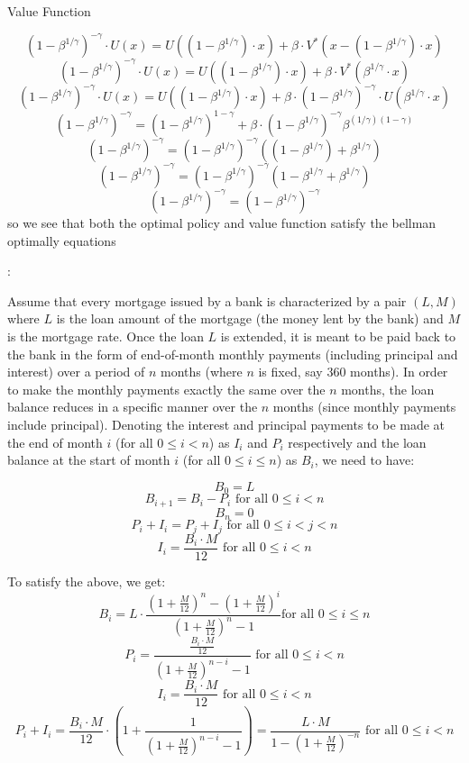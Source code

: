 \documentclass[12pt]{exam}
\begin{document}
\begin{questions}
\begin{itemize}
\begin{solution}
    Value Function
    
    \[(1-\beta^{1/\gamma})^{-\gamma} \cdot U(x) = U((1 - \beta^{1/\gamma}) \cdot x) + \beta \cdot V^*(x - (1 - \beta^{1/\gamma}) \cdot x)\]
    \[(1-\beta^{1/\gamma})^{-\gamma} \cdot U(x) = U((1 - \beta^{1/\gamma}) \cdot x) + \beta \cdot V^*(\beta^{1/\gamma} \cdot x)\]
    \[(1-\beta^{1/\gamma})^{-\gamma}\cdot U(x) = U((1 - \beta^{1/\gamma}) \cdot x) + \beta \cdot (1-\beta^{1/\gamma})^{-\gamma} \cdot U(\beta^{1/\gamma} \cdot x)\]
    \[(1-\beta^{1/\gamma})^{-\gamma} = (1 - \beta^{1/\gamma})^{1-\gamma} + \beta \cdot (1-\beta^{1/\gamma})^{-\gamma} \beta^{(1/\gamma)(1-\gamma)}\]
    \[(1-\beta^{1/\gamma})^{-\gamma} = (1 - \beta^{1/\gamma})^{-\gamma}((1 - \beta^{1/\gamma}) + \beta^{1/\gamma})\]
    \[(1-\beta^{1/\gamma})^{-\gamma} = (1 - \beta^{1/\gamma})^{-\gamma}(1 - \beta^{1/\gamma} + \beta^{1/\gamma})\]
    \[(1-\beta^{1/\gamma})^{-\gamma} = (1 - \beta^{1/\gamma})^{-\gamma}\]
    so we see that both the optimal policy and value function satisfy the bellman optimally equations
\end{solution}
\end{itemize}

\newpage
{}:

Assume that every mortgage issued by a bank is characterized by a pair $(L, M)$ where $L$ is the loan amount of the mortgage (the money lent by the bank) and $M$ is the mortgage rate. Once the loan $L$ is extended, it is meant to be paid back to the bank in the form of end-of-month monthly payments (including principal and interest) over a period of $n$ months (where $n$ is fixed, say 360 months). In order to make the monthly payments exactly the same over the $n$ months, the loan balance reduces in a specific manner over the $n$ months (since monthly payments include principal). Denoting the interest and principal payments to be made at the end of month $i$ (for all $0 \leq i < n$) as $I_i$ and $P_i$ respectively and the loan balance at the start of month $i$ (for all $0 \leq i \leq n$) as $B_i$, we need to have:

$$B_0 = L$$
$$B_{i+1} = B_i - P_i \text{ for all } 0 \leq i < n$$
$$B_n = 0$$
$$P_i + I_i = P_j + I_j \text{ for all } 0 \leq i < j < n$$
$$I_i = \frac {B_i \cdot M} {12} \text{ for all } 0 \leq i < n$$

To satisfy the above, we get:
$$B_i = L \cdot \frac {(1 + \frac M {12})^n - (1 + \frac M {12})^i} {(1 + \frac M {12})^n - 1} \text{for all } 0 \leq i \leq n$$
$$P_i = \frac {\frac {B_i \cdot M} {12}} {(1 + \frac M {12})^{n - i} - 1} \text{ for all } 0 \leq i < n$$
$$I_i = \frac {B_i \cdot M} {12} \text{ for all } 0 \leq i < n$$
$$P_i + I_i = \frac {B_i \cdot M} {12} \cdot (1 + \frac 1 {(1 + \frac M {12})^{n - i} - 1}) =  \frac {L \cdot M} {1 - (1 + \frac M {12})^{-n}} \text{ for all } 0 \leq i < n$$ 


\end{questions}
\end{document}
